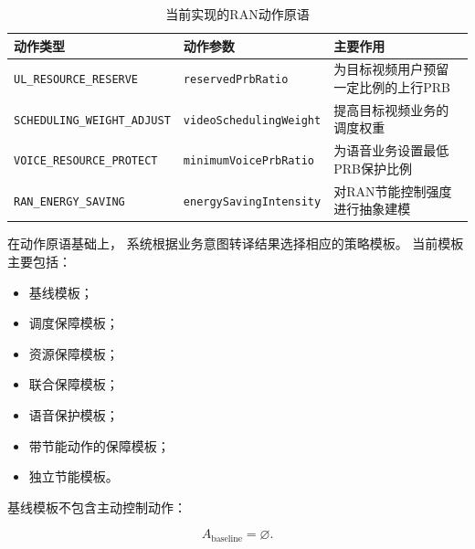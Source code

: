 \documentclass[lang=cn,12pt]{elegantbook}
\begin{document}
\begin{table}[H]
    \centering
    \caption{当前实现的RAN动作原语}
    \label{tab:ran_action_primitives_reduced}
    \small
    \renewcommand{\arraystretch}{1.25}
    \begin{tabularx}{\textwidth}{
        >{\raggedright\arraybackslash}p{}
        >{\raggedright\arraybackslash}p{}
        >{\raggedright\arraybackslash}X
    }
        \toprule
        动作类型 & 动作参数 & 主要作用 \\
        \midrule

        \texttt{UL\_RESOURCE\_RESERVE}
        & \texttt{reservedPrbRatio}
        & 为目标视频用户预留一定比例的上行PRB
        \\

        \texttt{SCHEDULING\_WEIGHT\_ADJUST}
        & \texttt{videoSchedulingWeight}
        & 提高目标视频业务的调度权重
        \\

        \texttt{VOICE\_RESOURCE\_PROTECT}
        & \texttt{minimumVoicePrbRatio}
        & 为语音业务设置最低PRB保护比例
        \\

        \texttt{RAN\_ENERGY\_SAVING}
        & \texttt{energySavingIntensity}
        & 对RAN节能控制强度进行抽象建模
        \\

        \bottomrule
    \end{tabularx}
\end{table}

在动作原语基础上，
系统根据业务意图转译结果选择相应的策略模板。
当前模板主要包括：

\begin{itemize}
    \item 基线模板；
    \item 调度保障模板；
    \item 资源保障模板；
    \item 联合保障模板；
    \item 语音保护模板；
    \item 带节能动作的保障模板；
    \item 独立节能模板。
\end{itemize}

基线模板不包含主动控制动作：

\begin{equation}
A_{\mathrm{baseline}}
=
\varnothing.
\label{eq:baseline_template_reduced}
\end{equation}
\end{document}
